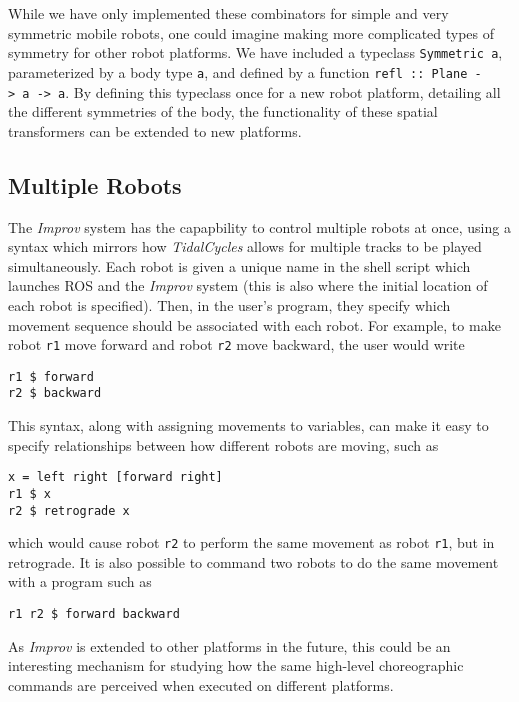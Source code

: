 \documentclass[sigconf]{acmart}
\begin{document}
While we have only implemented these combinators for simple and very
symmetric mobile robots, one could imagine making more complicated types
of symmetry for other robot platforms. We have included a typeclass
\texttt{Symmetric\ a}, parameterized by a body type \texttt{a}, and defined by a function
\texttt{refl\ ::\ Plane\ -\textgreater{}\ a\ -\textgreater{}\ a}. By defining this
typeclass once for a new robot platform, detailing all the different symmetries of
the body, the functionality of these spatial transformers can be
extended to new platforms.

\subsection{Multiple Robots}\label{multiple-robots}

The \emph{Improv} system has the capapbility to control multiple robots
at once, using a syntax which mirrors how \emph{TidalCycles} allows for
multiple tracks to be played simultaneously. Each robot is given a
unique name in the shell script which launches ROS and the \emph{Improv}
system (this is also where the initial location of each robot is
specified). Then, in the user's program, they specify which movement
sequence should be associated with each robot. For example, to make
robot \texttt{r1} move forward and robot \texttt{r2} move backward, the
user would write

\begin{verbatim}
r1 $ forward
r2 $ backward
\end{verbatim}

This syntax, along with assigning movements to variables, can make it easy to
specify relationships between how different robots are moving, such as

\begin{verbatim}
x = left right [forward right]
r1 $ x
r2 $ retrograde x
\end{verbatim}


which would cause robot \texttt{r2} to perform the same movement as
robot \texttt{r1}, but in retrograde. It is also possible to command two robots
to do the same movement with a program such as

\begin{verbatim}
r1 r2 $ forward backward
\end{verbatim}

As \emph{Improv} is extended to other platforms in the future, this could be an
interesting mechanism for studying how the same high-level choreographic
commands are perceived when executed on different platforms.
\end{document}
